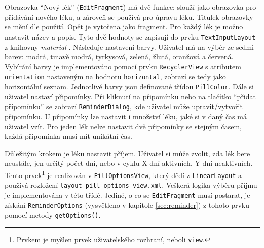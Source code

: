 \documentclass[../TakeYourPill.tex]{subfiles}
\begin{document}
Obrazovka \enquote{Nový lék} (\texttt{EditFragment}) má dvě funkce; slouží jako obrazovka pro přidávání nového léku, a zároveň se používá pro úpravu léku. Titulek obrazovky se mění dle použití. Opět je vytořena jako fragment. Pro každý lék je možno nastavit název a popis. Tyto dvě hodnoty se zapisují do prvku \texttt{TextInputLayout} z knihovny \textit{material} \cite{materialdesign-android}. Následuje nastavení barvy. Uživatel má na výběr ze sedmi barev: modrá, tmavě modrá, tyrkysová, zelená, žlutá, oranžová a červená. Vybírání barvy je implementováno pomocí prvku \texttt{RecyclerView} s atributem \texttt{orientation} nastaveným na hodnotu \texttt{horizontal}, zobrazí se tedy jako horizontální seznam. Jednotlivé barvy jsou definované třídou \texttt{PillColor}. Dále si uživatel nastaví připomínky. Při kliknutí na připomínku nebo na tlačítko \enquote{přidat připomínku} se zobrazí \texttt{ReminderDialog}, kde uživatel může upravit/vytvořit připomínku. U připomínky lze nastavit i množství léku, jaké si v daný čas má uživatel vzít. Pro jeden lék nelze nastavit dvě připomínky se stejným časem, každá připomínka musí mít unikátní čas. 

Důležitým krokem je léku nastavit příjem. Uživatel si může zvolit, zda lék bere neustále, jen určitý počet dní, nebo v cyklu X dní aktivních, Y dní neaktivních. Tento prvek\footnote{Prvkem je myšlen prvek uživatelského rozhraní, neboli \texttt{view}.} je realizován v \texttt{PillOptionsView}, který dědí z \texttt{LinearLayout} a používá rozložení \texttt{layout\_pill\_options\_view.xml}. Veškerá logika výběru příjmu je implementována v této třídě. Jediné, o co se \texttt{EditFragment} musí postarat, je získání \texttt{ReminderOptions} (vysvětleno v kapitole \ref{sec:reminder}) z tohoto prvku pomocí metody \texttt{getOptions()}.
\end{document}

